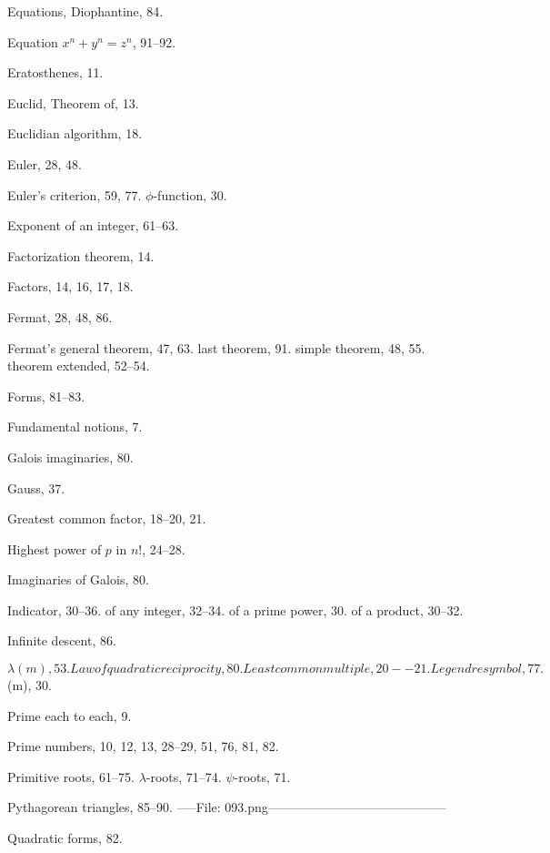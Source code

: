 \documentclass[oneside]{book}
\begin{document}
Equations, Diophantine, 84.

Equation $x^n + y^n =z^n$, 91--92.

Eratosthenes, 11.

Euclid, Theorem of, 13.

Euclidian algorithm, 18.

Euler, 28, 48.

Euler's criterion, 59, 77.
  $\phi$-function, 30.

Exponent of an integer, 61--63.



Factorization theorem, 14.

Factors, 14, 16, 17, 18.

Fermat, 28, 48, 86.

Fermat's general theorem, 47, 63.
  last theorem, 91.
  simple theorem, 48, 55.
  theorem extended, 52--54.

Forms, 81--83.

Fundamental notions, 7.



Galois imaginaries, 80.

Gauss, 37.

Greatest common factor, 18--20, 21.



Highest power of $p$ in $n!$, 24--28.



Imaginaries of Galois, 80.

Indicator, 30--36.
  of any integer, 32--34.
  of a prime power, 30.
  of a product, 30--32.

Infinite descent, 86.



$\lambda(m), 53.

Law of quadratic reciprocity, 80.

Least common multiple, 20--21.

Legendre symbol, 77.



$\phi(m), 30.

Prime each to each, 9.

Prime numbers, 10, 12, 13, 28--29, 51, 76, 81, 82.

Primitive roots, 61--75.
  $\lambda$-roots, 71--74.
  $\psi$-roots, 71.

Pythagorean triangles, 85--90.
-----File: 093.png---\ggna{}\----------------------------------------

Quadratic forms, 82.
\end{document}
